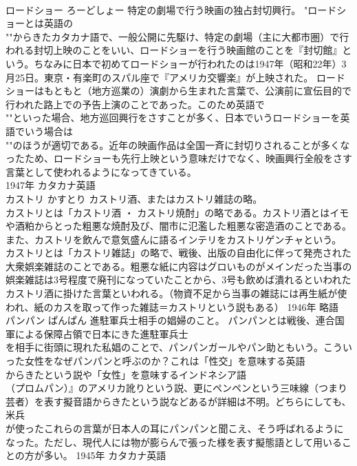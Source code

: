 \documentclass[8pt]{extreport}
\begin{document}
\begin{CJK}{UTF8}{min}
\\	ロードショー	ろーどしょー	特定の劇場で行う映画の独占封切興行。	"ロードショーとは英語の
\\	""からきたカタカナ語で、一般公開に先駆け、特定の劇場（主に大都市圏）で行われる封切上映のことをいい、ロードショーを行う映画館のことを『封切館』という。ちなみに日本で初めてロードショーが行われたのは1947年（昭和22年）3月25日。東京・有楽町のスパル座で『アメリカ交響楽』が上映された。 ロードショーはもともと（地方巡業の）演劇から生まれた言葉で、公演前に宣伝目的で行われた路上での予告上演のことであった。このため英語で
\\	""といった場合、地方巡回興行をさすことが多く、日本でいうロードショーを英語でいう場合は
\\	""のほうが適切である。近年の映画作品は全国一斉に封切りされることが多くなったため、ロードショーも先行上映という意味だけでなく、映画興行全般をさす言葉として使われるようになってきている。
\\	1947年	カタカナ英語	
\\	カストリ	かすとり	カストリ酒、またはカストリ雑誌の略。	
\\	カストリとは「カストリ酒 ・ カストリ焼酎」の略である。カストリ酒とはイモや酒粕からとった粗悪な焼酎及び、闇市に氾濫した粗悪な密造酒のことである。また、カストリを飲んで意気盛んに語るインテリをカストリゲンチャという。 
\\	カストリとは「カストリ雑誌」の略で、戦後、出版の自由化に伴って発売された大衆娯楽雑誌のことである。粗悪な紙に内容はグロいものがメインだった当事の娯楽雑誌は3号程度で廃刊になっていたことから、3号も飲めば潰れるといわれたカストリ酒に掛けた言葉といわれる。（物資不足から当事の雑誌には再生紙が使われ、紙のカスを取って作った雑誌＝カストリという説もある）	1946年	略語	
\\	パンパン	ぱんぱん	進駐軍兵士相手の娼婦のこと。	パンパンとは戦後、連合国軍による保障占領で日本にきた進駐軍兵士
\\	を相手に街頭に現れた私娼のことで、パンパンガールやパン助ともいう。こういった女性をなぜパンパンと呼ぶのか？これは「性交」を意味する英語
\\	からきたという説や「女性」を意味するインドネシア語
\\	（プロムパン）』のアメリカ訛りという説、更にペンペンという三味線（つまり芸者）を表す擬音語からきたという説などあるが詳細は不明。どちらにしても、米兵
\\	が使ったこれらの言葉が日本人の耳にパンパンと聞こえ、そう呼ばれるようになった。ただし、現代人には物が膨らんで張った様を表す擬態語として用いることの方が多い。	1945年	カタカナ英語

\end{CJK}
\end{document}
